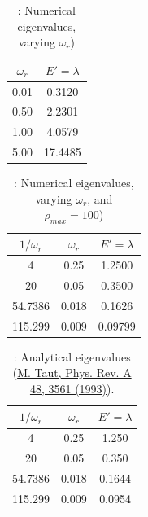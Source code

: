 \documentclass{article}
\begin{document}
		\begin{table}[h!]
			\caption{: Numerical eigenvalues, varying $\omega_{r}$)}
			\begin{tabular}{c c}
				$\omega_r$ & $E' = \lambda$ \\
				\hline
				0.01 & 0.3120 \\
				0.50 & 2.2301 \\
				1.00 & 4.0579 \\
			  	5.00 & 17.4485 \\
			\end{tabular}
		\end{table}


				\begin{table}[h!]
					\caption{: Numerical eigenvalues, varying $\omega_{r}$, and $\rho_{max} = 100$)}
					\begin{tabular}{c c c}
						$1/\omega_{r}$ & $\omega_r$ & $E' = \lambda$ \\
						\hline
						4 & 0.25 & 1.2500 \\
						20 & 0.05 & 0.3500 \\
						54.7386 & 0.018 & 0.1626 \\
						115.299 & 0.009 & 0.09799 \\
					\end{tabular}
				\end{table}

		\begin{table}[h!]
			\caption{: Analytical eigenvalues (\href{http://prola.aps.org/abstract/PRA/v48/i5/p3561_1}{M. Taut, Phys. Rev. A 48, 3561 (1993)}).}
			\begin{tabular}{c c c}
				$1/\omega_{r}$ & $\omega_r$ & $E' = \lambda$ \\
				\hline
				4 & 0.25 & 1.250\\
				20 & 0.05 & 0.350 \\
				54.7386 & 0.018 & 0.1644 \\
				115.299 & 0.009 & 0.0954 \\
			\end{tabular}
		\end{table}
\end{document}
